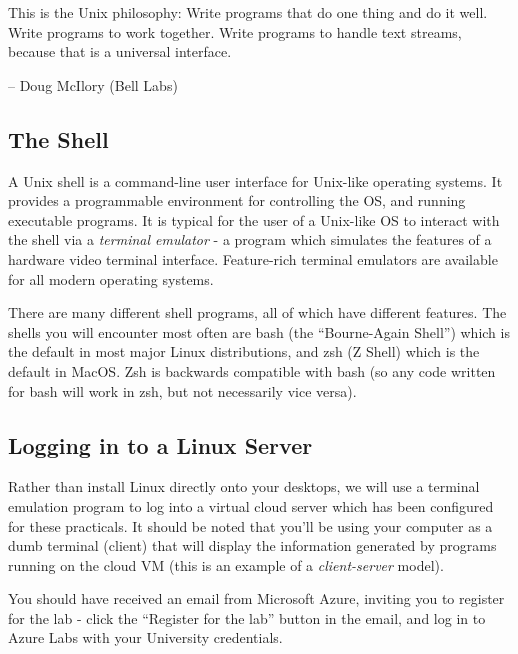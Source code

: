 \documentclass[
  english,
  paper=a4,
  ,captions=tableheading
]{scrartcl}
\renewenvironment{quote}{\begin{customblockquote}\list{}{\rightmargin=0em\leftmargin=0em}%
\item\relax\color{blockquote-text}\ignorespaces}{\unskip\unskip\endlist\end{customblockquote}}
\begin{document}
\begin{quote}
This is the Unix philosophy: Write programs that do one thing and do it
well. Write programs to work together. Write programs to handle text
streams, because that is a universal interface.

-- Doug McIlory (Bell Labs)
\end{quote}

\hypertarget{the-shell}{%
\subsection{The Shell}\label{the-shell}}

A Unix shell is a command-line user interface for Unix-like operating
systems. It provides a programmable environment for controlling the OS,
and running executable programs. It is typical for the user of a
Unix-like OS to interact with the shell via a \emph{terminal emulator} -
a program which simulates the features of a hardware video terminal
interface. Feature-rich terminal emulators are available for all modern
operating systems.

There are many different shell programs, all of which have different
features. The shells you will encounter most often are bash (the
\enquote{Bourne-Again Shell}) which is the default in most major Linux
distributions, and zsh (Z Shell) which is the default in MacOS. Zsh is
backwards compatible with bash (so any code written for bash will work
in zsh, but not necessarily vice versa).

\hypertarget{logging-in-to-a-linux-server}{%
\subsection{Logging in to a Linux
Server}\label{logging-in-to-a-linux-server}}

Rather than install Linux directly onto your desktops, we will use a
terminal emulation program to log into a virtual cloud server which has
been configured for these practicals. It should be noted that you'll be
using your computer as a dumb terminal (client) that will display the
information generated by programs running on the cloud VM (this is an
example of a \emph{client-server} model).

You should have received an email from Microsoft Azure, inviting you to
register for the lab - click the \enquote{Register for the lab} button
in the email, and log in to Azure Labs with your University credentials.
\end{document}
